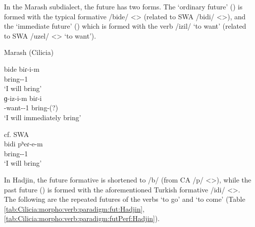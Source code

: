 
In the Marash subdialect, the future has two forms. The `ordinary future' () is formed with the typical formative /bide/ <> (related to SWA /bidi/ <>), and the `immediate future' () which is formed with the verb /izil/ `to want' (related to SWA /uzel/ <> `to want').

\begin{exe}
	\ex\label{sent:Cilicia:morpho:verb:fut:marash} \begin{xlist}
		\ex Marash (Cilicia) 
		\begin{xlist}
			\ex \gll bide biɾ-i-m \\
			{\fut} bring-{\thgloss}-1{\sg} \\
			\trans `I will bring' \\ 
			\ex \gll ɡ-iz-i-m biɾ-i \\
			{\ind}-want-{\thgloss}-1{\sg} bring-{\thgloss}(?) \\
			\trans `I will immediately bring' \\ 
			
		\end{xlist}
		\ex cf. SWA \\
		 \gll bidi pʰeɾ-e-m \\
		{\fut} bring-{\thgloss}-1{\sg} \\
		\trans `I will bring' \\ 
	\end{xlist} 
\end{exe}


In Hadjin, the future formative is shortened to /b/ (from CA /p/ <>), while the past future () is formed with the aforementioned Turkish formative /idi/ <>. The following are the repeated futures of the verbs `to go' and `to come' (Table \ref{tab:Cilicia:morpho:verb:paradigm:fut:Hadjin}, \ref{tab:Cilicia:morpho:verb:paradigm:futPerf:Hadjin}).




